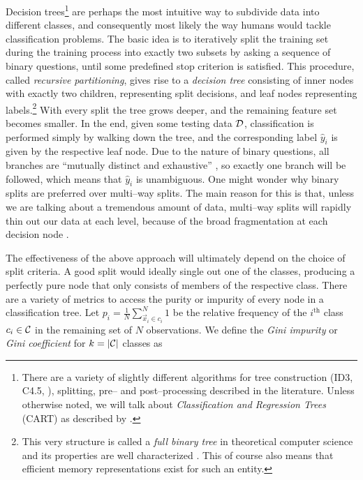 Decision trees\footnote{There are a variety of slightly different algorithms for tree construction (ID3, C4.5, \etc), splitting, pre-- and post--processing described in the literature. Unless otherwise noted, we will talk about \emph{Classification and Regression Trees} (CART) as described by \citet{breiman1984}.} \citep{breiman1984} are perhaps the most intuitive way to subdivide data into different classes, and consequently most likely the way humans would tackle classification problems. The basic idea is to iteratively split the training set during the training process into exactly two subsets by asking a sequence of binary questions, until some predefined stop criterion is satisfied. This procedure, called \emph{recursive partitioning}, gives rise to a \emph{decision tree} consisting of inner nodes with exactly two children, representing split decisions, and leaf nodes representing labels.\footnote{This very structure is called a \emph{full binary tree} in  theoretical computer science and its properties are well characterized \citep{knuth1981}. This of course also means that efficient memory representations exist for such an entity.} With every split the tree grows deeper, and the remaining feature set becomes smaller. In the end, given some testing data $\mathcal{D}$, classification is performed simply by walking down the tree, and the corresponding label $\hat y_i$ is given by the respective leaf node. Due to the nature of binary questions, all branches are ``mutually distinct and exhaustive'' \citep{duda2001}, so exactly one branch will be followed, which means that $\hat y_i$ is unambiguous. One might wonder why binary splits are preferred over multi--way splits. The main reason for this is that, unless we are talking about a tremendous amount of data, multi--way splits will rapidly thin out our data at each level, because of the broad fragmentation at each decision node \citep{hastie2001}. %
\\



The effectiveness of the above approach will ultimately depend on the choice of split criteria. A good split would ideally single out one of the classes, producing a perfectly pure node that only consists of members of the respective class. There are a variety of metrics to access the purity or impurity of every node in a classification tree. Let $p_i = \frac{1}{N} \sum\limits_{\vec x_i \in c_i}^N 1$ be the relative frequency of the $i^{\text{th}}$ class $c_i \in \mathcal{C}$ in the remaining set of $N$ observations. We define the \emph{Gini impurity} or \emph{Gini coefficient} for $k = |\mathcal{C}|$ classes as

